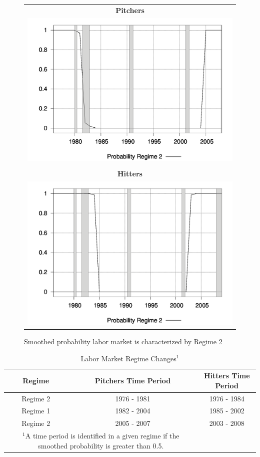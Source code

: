 \documentclass[12pt]{article}
\begin{document}
\begin{figure}\caption{Smoothed probability labor market is characterized by Regime 2}
\begin{center}
\begin{tabular}{c}
\textbf{Pitchers} \\
\includegraphics[scale=0.2]{pitchers/regime.png} \\ \\
\textbf{Hitters} \\
\includegraphics[scale=0.2]{hitters/regime.png} \\
\end{tabular}
\end{center}
\end{figure}

\begin{table}\caption{Labor Market Regime Changes$^1$}\label{tb:regimes}
\begin{center}
\begin{tabular}{ccc}
Regime & Pitchers Time Period & Hitters Time Period \\ \hline
Regime 2 & 1976 - 1981 & 1976 - 1984 \\
Regime 1 & 1982 - 2004 & 1985 - 2002 \\
Regime 2 & 2005 - 2007 & 2003 - 2008 \\
\hline
\multicolumn{2}{p{2.5in}}{$^1$A time period is identified in a given regime if the smoothed probability is greater than 0.5.}
\end{tabular}
\end{center}
\end{table}
\end{document}
